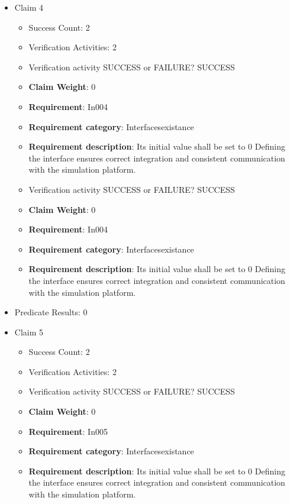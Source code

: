 \documentclass{article}
\begin{document}
\begin{itemize}
  				  \item Claim 4
				\begin{itemize}
			    	\item Success Count: 2 
			    	\item Verification Activities: 2
					\item Verification activity SUCCESS or FAILURE? SUCCESS
					\item \textbf{Claim Weight}: 0
						\item \textbf{Requirement}: In004 
						\item \textbf{Requirement category}: Interfacesexistance 
						\item \textbf{Requirement description}: Its initial value shall be set to 0 Defining the interface ensures correct integration and consistent communication with the simulation platform.
					
					\item Verification activity SUCCESS or FAILURE? SUCCESS
					\item \textbf{Claim Weight}: 0
						\item \textbf{Requirement}: In004 
						\item \textbf{Requirement category}: Interfacesexistance 
						\item \textbf{Requirement description}: Its initial value shall be set to 0 Defining the interface ensures correct integration and consistent communication with the simulation platform.
					
				\end{itemize}
				
									    
				\item Predicate Results: 0

  				  \item Claim 5
				\begin{itemize}
			    	\item Success Count: 2 
			    	\item Verification Activities: 2
					\item Verification activity SUCCESS or FAILURE? SUCCESS
					\item \textbf{Claim Weight}: 0
						\item \textbf{Requirement}: In005 
						\item \textbf{Requirement category}: Interfacesexistance 
						\item \textbf{Requirement description}: Its initial value shall be set to 0 Defining the interface ensures correct integration and consistent communication with the simulation platform.
					

\end{itemize}
\end{itemize}
\end{document}
